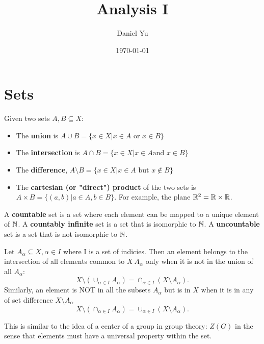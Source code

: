 \documentclass[a4paper]{article}
\title{\Huge{Analysis I}}
\author{\huge{Daniel Yu}}
\date{\today}
\begin{document}
\maketitle
\newpage%
\tableofcontents
\pagebreak

\section{Sets}
Given two sets $A,B \subseteq X$:
\begin{itemize}
  \item The \textbf{union} is $A \cup B = \{x \in X | x \in A \text{ or } x \in B\}$
  \item The \textbf{intersection} is $A \cap B = \{ x \in X | x \in A \text{and } x \in B\}$ 
  \item The \textbf{difference}, $A \setminus B = \{x \in X | x \in A \text{ but } x \not\in B\}$ 
  \item The \textbf{cartesian (or "direct") product} of the two sets is $A \times B = \{(a,b) | a \in A, b \in B\}$. For example, the plane $\mathbb{R}^2 = \mathbb{R} \times \mathbb{R}$.
\end{itemize}

\begin{definition}
  A \textbf{countable} set is a set where each element can be mapped to a unique element of $\mathbb{N}$.
  A \textbf{countably infinite} set is a set that is isomorphic to $\mathbb{N}$.
  A \textbf{uncountable} set is a set that is not isomorphic to $\mathbb{N}$.
\end{definition}

\begin{theorem}
  Let $A_{\alpha} \subseteq X, \alpha \in I$ where I is a set of indicies. Then an element belongs to the intersection of all elements common to $X \ A_{\alpha}$ only when it is not in the union 
  of all $A_{\alpha}$: 
   \[
     X \setminus (\cup_{\alpha \in I} A_{\alpha}) = \cap_{\alpha \in I} (X \setminus A_{\alpha})
  .\]
  Similarly, an element is NOT in all the subsets $A_{\alpha}$ but is in $X$ when it is in any of set difference $X \setminus A_{\alpha}$
  \[
    X \setminus (\cap_{\alpha \in I} A_{\alpha}) = \cup_{\alpha \in I} (X \setminus A_{\alpha})
  .\] 

\end{theorem}

\begin{remark}
  This is similar to the idea of a center of a group in group theory: $Z(G)$ in the sense that elements must have a universal property within the set.
\end{remark}
\end{document}
